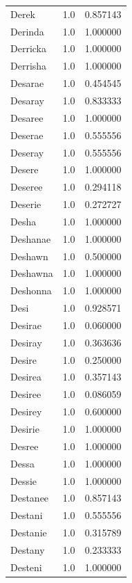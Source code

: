 \documentclass[
  letterpaper,
  DIV=11,
  numbers=noendperiod]{scrreprt}
\begin{document}
\begin{tabular}{lrr}
Derek           &   1.0 &   0.857143 \\
Derinda         &   1.0 &   1.000000 \\
Derricka        &   1.0 &   1.000000 \\
Derrisha        &   1.0 &   1.000000 \\
Desarae         &   1.0 &   0.454545 \\
Desaray         &   1.0 &   0.833333 \\
Desaree         &   1.0 &   1.000000 \\
Deserae         &   1.0 &   0.555556 \\
Deseray         &   1.0 &   0.555556 \\
Desere          &   1.0 &   1.000000 \\
Deseree         &   1.0 &   0.294118 \\
Deserie         &   1.0 &   0.272727 \\
Desha           &   1.0 &   1.000000 \\
Deshanae        &   1.0 &   1.000000 \\
Deshawn         &   1.0 &   0.500000 \\
Deshawna        &   1.0 &   1.000000 \\
Deshonna        &   1.0 &   1.000000 \\
Desi            &   1.0 &   0.928571 \\
Desirae         &   1.0 &   0.060000 \\
Desiray         &   1.0 &   0.363636 \\
Desire          &   1.0 &   0.250000 \\
Desirea         &   1.0 &   0.357143 \\
Desiree         &   1.0 &   0.086059 \\
Desirey         &   1.0 &   0.600000 \\
Desirie         &   1.0 &   1.000000 \\
Desree          &   1.0 &   1.000000 \\
Dessa           &   1.0 &   1.000000 \\
Dessie          &   1.0 &   1.000000 \\
Destanee        &   1.0 &   0.857143 \\
Destani         &   1.0 &   0.555556 \\
Destanie        &   1.0 &   0.315789 \\
Destany         &   1.0 &   0.233333 \\
Desteni         &   1.0 &   1.000000 \\

\end{tabular}
\end{document}
